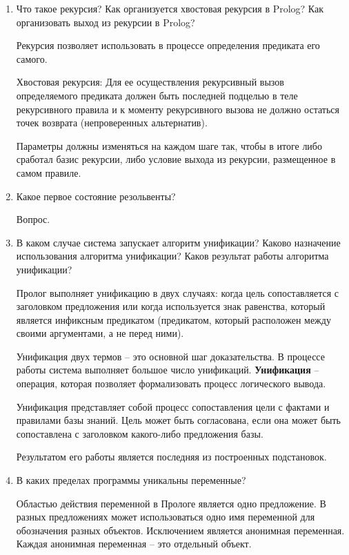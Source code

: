 \documentclass[a4paper,14pt]{extreport} %
\begin{document}
\begin{enumerate} 

\item Что такое рекурсия? Как организуется хвостовая рекурсия в Prolog? Как организовать выход из рекурсии в Prolog?

Рекурсия позволяет использовать в процессе определения предиката его самого. 

Хвостовая рекурсия: Для ее осуществления рекурсивный вызов определяемого предиката должен быть последней подцелью в теле рекурсивного правила и к моменту рекурсивного вызова не должно остаться точек возврата (непроверенных альтернатив). 

Параметры должны изменяться на каждом шаге так, чтобы в итоге либо сработал базис рекурсии, либо условие выхода из рекурсии, размещенное в самом правиле.

\item Какое первое состояние резольвенты?

Вопрос. 

\item В каком случае система запускает алгоритм унификации? Каково назначение использования алгоритма унификации? Каков результат работы алгоритма унификации? 

Пролог выполняет унификацию в двух случаях: когда цель сопоставляется с заголовком предложения или когда используется знак равенства, который является инфиксным предикатом (предикатом, который расположен между своими аргументами, а не перед ними).

Унификация двух термов -- это основной шаг доказательства. В процессе работы система выполняет большое число унификаций.
\textbf{Унификация} -- операция, которая позволяет формализовать процесс логического вывода. 

Унификация представляет собой процесс сопоставления цели с фактами и правилами базы знаний. Цель может быть согласована, если она может быть сопоставлена с заголовком какого-либо предложения базы.

Результатом его работы является последняя из построенных подстановок. 

\item В каких пределах программы уникальны переменные? 

Областью действия переменной в Прологе является одно предложение. В разных предложениях может использоваться одно имя переменной для обозначения разных объектов. Исключением является анонимная переменная. Каждая анонимная переменная -- это отдельный объект.


\end{enumerate}
\end{document}
